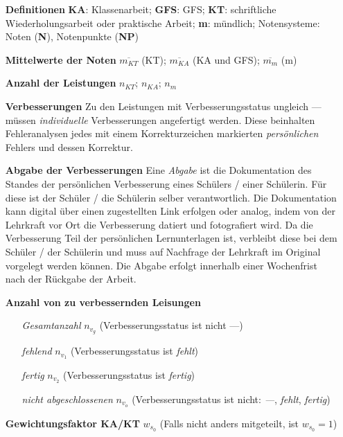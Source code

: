\documentclass{article}
\begin{document}
\begin{enumerate}[label=\textbf{\textbullet}, align=left, leftmargin=*]
	\item[\textbf{Definitionen}] \textbf{KA}: Klassenarbeit; \textbf{GFS}: GFS; \textbf{KT}: schriftliche Wiederholungsarbeit oder praktische Arbeit; \textbf{m}: mündlich; Notensysteme: Noten (\textbf{N}), Notenpunkte (\textbf{NP})
	\item[\textbf{Mittelwerte der Noten}] $\overline{m_{KT}}$ (KT); $\overline{m_{KA}}$ (KA und GFS); $\overline{m_{m}}$ (m)
	\item[\textbf{Anzahl der Leistungen}] $n_{KT}$; $n_{KA}$; $n_{m}$
	\item[\textbf{Verbesserungen}] Zu den Leistungen mit Verbesserungsstatus ungleich \glqq ---\grqq{} müssen \textit{individuelle} Verbesserungen angefertigt werden. Diese beinhalten Fehleranalysen jedes mit einem Korrekturzeichen markierten \textit{persönlichen} Fehlers und dessen Korrektur.
	\item[\textbf{Abgabe der Verbesserungen}] Eine \glqq \textit{Abgabe}\grqq{} ist die Dokumentation des Standes der persönlichen Verbesserung eines Schülers / einer Schülerin. Für diese ist der Schüler / die Schülerin selber verantwortlich. Die Dokumentation kann digital über einen zugestellten Link erfolgen oder analog, indem von der Lehrkraft vor Ort die Verbesserung datiert und fotografiert wird. Da die Verbesserung Teil der persönlichen Lernunterlagen ist, verbleibt diese bei dem Schüler / der Schülerin und muss auf Nachfrage der Lehrkraft im Original vorgelegt werden können. Die Abgabe erfolgt innerhalb einer Wochenfrist nach der Rückgabe der Arbeit.
	\item[\textbf{Anzahl von zu verbessernden Leisungen}] \mbox{} \
	\begin{enumerate}[label=\textbf{\textbullet}, align=left, leftmargin=*]
		\item[\textit{Gesamtanzahl}] $n_{v_g}$ (Verbesserungsstatus ist nicht \glqq ---\grqq{})
		\item[\textit{fehlend}] $n_{v_1}$ (Verbesserungsstatus ist \glqq \textit{fehlt}\grqq{})
		\item[\textit{fertig}] $n_{v_2}$ (Verbesserungsstatus ist \glqq \textit{fertig}\grqq{})
		\item[\textit{nicht abgeschlossenen}] $n_{v_o}$ (Verbesserungsstatus ist nicht: \glqq\textit{---}\grqq{}, \glqq\textit{fehlt}\grqq{}, \glqq\textit{fertig}\grqq{})
	\end{enumerate}
	\item[\textbf{Gewichtungsfaktor KA/KT}] $w_{s_0}$ (Falls nicht anders mitgeteilt, ist $w_{s_0}=1$)

\end{enumerate}
\end{document}
